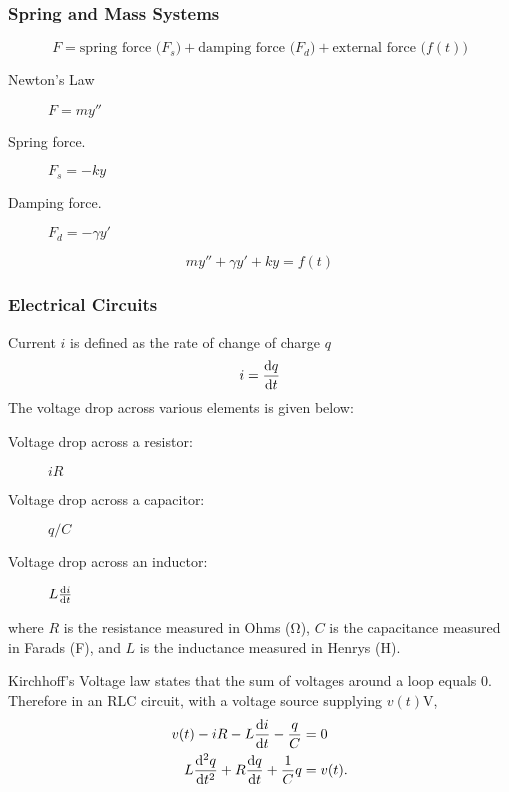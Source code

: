 \documentclass{article}
\begin{document}
\subsubsection{Spring and Mass Systems}
\begin{equation*}
    F = \text{spring force (\(F_s\))} + \text{damping force (\(F_d\))} + \text{external force (\(f(t)\))}
\end{equation*}
\begin{description}
    \item[Newton's Law] \(F = m y''\)
    \item[Spring force.] \(F_s = -k y\)
    \item[Damping force.] \(F_d = -\gamma y'\)
\end{description}
\begin{equation*}
    m y'' + \gamma y' + k y = f(t)
\end{equation*}
\subsubsection{Electrical Circuits}
Current \(i\) is defined as the rate of change of charge \(q\)
\begin{equation*}
    i = \dv{q}{t}
\end{equation*}
The voltage drop across various elements is given below:
\begin{description}
    \item[Voltage drop across a resistor:] \(iR\)
    \item[Voltage drop across a capacitor:] \(q/C\)
    \item[Voltage drop across an inductor:] \(L \dv{i}{t}\)
\end{description}
where \(R\) is the resistance measured in Ohms (\si{\ohm}),
\(C\) is the capacitance measured in Farads (\si{\farad}),
and \(L\) is the inductance measured in Henrys (\si{\henry}).

Kirchhoff's Voltage law states that the sum of voltages around a loop equals 0.
Therefore in an RLC circuit, with a voltage source supplying \(v(t)\si{\volt}\),
\begin{align*}
    v(t) - iR - L \dv{i}{t} - \frac{q}{C}      & = 0     \\
    L \dv[2]{q}{t} + R\dv{q}{t} + \frac{1}{C}q & = v(t).
\end{align*}
\end{document}
